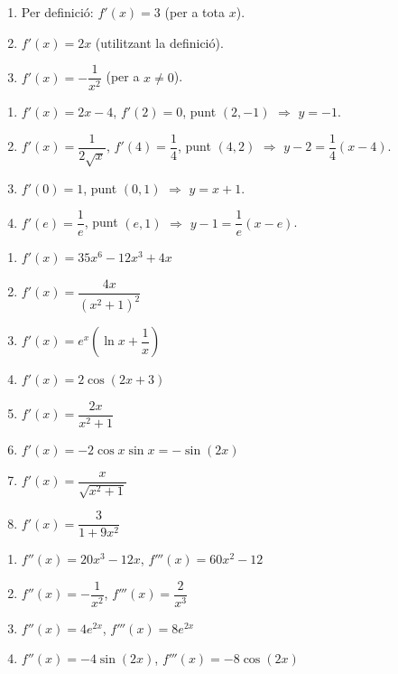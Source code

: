 \documentclass[12pt]{article}
\begin{document}
\begin{solucio}
\begin{enumerate}
    \item Per definició: $f'(x)=3$ (per a tota $x$).
    \item $f'(x)=2x$ (utilitzant la definició).
    \item $f'(x)=-\dfrac{1}{x^2}$ (per a $x\neq 0$).
\end{enumerate}
\end{solucio}

\begin{solucio}
\begin{enumerate}
    \item $f'(x)=2x-4$, $f'(2)=0$, punt $(2,-1)$ $\Rightarrow$ $y=-1$.
    \item $f'(x)=\dfrac{1}{2\sqrt{x}}$, $f'(4)=\dfrac{1}{4}$, punt $(4,2)$ $\Rightarrow$ $y-2=\dfrac{1}{4}(x-4)$.
    \item $f'(0)=1$, punt $(0,1)$ $\Rightarrow$ $y=x+1$.
    \item $f'(e)=\dfrac{1}{e}$, punt $(e,1)$ $\Rightarrow$ $y-1=\dfrac{1}{e}(x-e)$.
\end{enumerate}
\end{solucio}

\begin{solucio}
\begin{enumerate}
    \item $f'(x)=35x^6-12x^3+4x$
    \item $f'(x)=\dfrac{4x}{(x^2+1)^2}$
    \item $f'(x)=e^x\left(\ln x + \dfrac{1}{x}\right)$
    \item $f'(x)=2\cos(2x+3)$
    \item $f'(x)=\dfrac{2x}{x^2+1}$
    \item $f'(x)=-2\cos x \sin x = -\sin(2x)$
    \item $f'(x)=\dfrac{x}{\sqrt{x^2+1}}$
    \item $f'(x)=\dfrac{3}{1+9x^2}$
\end{enumerate}
\end{solucio}

\begin{solucio}
\begin{enumerate}
    \item $f''(x)=20x^3-12x$, $f'''(x)=60x^2-12$
    \item $f''(x)=-\dfrac{1}{x^2}$, $f'''(x)=\dfrac{2}{x^3}$
    \item $f''(x)=4e^{2x}$, $f'''(x)=8e^{2x}$
    \item $f''(x)=-4\sin(2x)$, $f'''(x)=-8\cos(2x)$
\end{enumerate}
\end{solucio}
\end{document}
